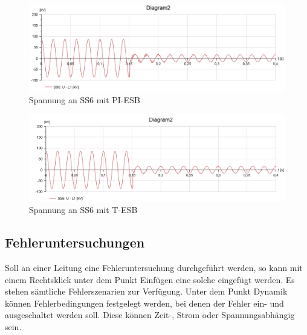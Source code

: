\documentclass{scrartcl}
\begin{document}
\begin{onehalfspace}
	\begin{figure}[H]
	\centering
	\includegraphics[scale=0.45]{img/u-pi.png}
	\caption{Spannung an SS6 mit PI-ESB}
	\label{u-pi}
	\end{figure}
	
	\begin{figure}[H]
	\centering
	\includegraphics[scale=0.45]{img/u-t.png}
	\caption{Spannung an SS6 mit T-ESB}
	\label{u-t}
	\end{figure}

\subsection{Fehleruntersuchungen}
Soll an einer Leitung eine Fehleruntersuchung durchgeführt werden, so kann mit einem Rechtsklick unter dem Punkt Einfügen eine solche eingefügt werden. Es stehen sämtliche Fehlerszenarien zur Verfügung. Unter dem Punkt Dynamik können Fehlerbedingungen festgelegt werden, bei denen der Fehler ein- und ausgeschaltet werden soll. Diese können Zeit-, Strom oder Spannungsabhängig sein.


\end{onehalfspace}
\end{document}
